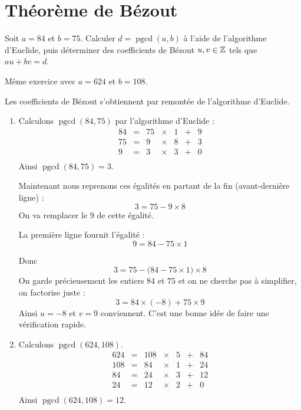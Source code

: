 \documentclass[11pt,class=report,crop=false]{standalone}
\newcommand{\pgcd}{\mathop{\mathrm{pgcd}}\nolimits}
\begin{document}
\section{Théorème de Bézout}


\exercice{}
\enonce
Soit $a=84$ et $b=75$. Calculer $d=\pgcd(a,b)$ à l'aide de l'algorithme d'Euclide, puis déterminer des coefficients de Bézout $u,v \in \mathbb{Z}$ tels que $au+bv=d$.

Même exercice avec $a=624$ et $b=108$.
\finenonce

\indication
Les coefficients de Bézout s'obtiennent par remontée de l'algorithme d'Euclide.
\finindication

\correction
\sauteligne

\begin{enumerate}
    \item   
    Calculons $\pgcd(84,75)$ par l'algorithme d'Euclide :
    $$
    \begin{array}{rclclcl}
    84 & = & 75 & \times & 1 & + & 9 \\
    75 & = & 9  & \times & 8 & + & \boxed{3} \\
    9  & = & 3  & \times & 3 & + & 0 \\
    \end{array}
    $$
    Ainsi $\pgcd(84,75) = 3$.
    
    Maintenant nous reprenons ces égalités en partant de la fin (avant-dernière ligne) :
    $$\boxed{3} = 75 - 9 \times 8$$
    On va remplacer le $9$ de cette égalité.
    
    La première ligne fournit l'égalité :
    $$9 = 84 -75 \times 1$$
    
    Donc 
    $$\boxed{3} = 75 - \big(84 -75 \times 1 \big) \times 8$$
    On garde précieusement les entiers $84$ et $75$ et on ne cherche pas à simplifier, on factorise juste :
    $$\boxed{3} = 84 \times (-8)  + 75 \times 9$$
    Ainsi $u=-8$ et $v=9$ conviennent. C'est une bonne idée de faire une vérification rapide.
    
    
    \item 
    Calculons $\pgcd(624,108)$.
    $$
    \begin{array}{rclclcl}
    624 & = & 108 & \times & 5 & + & 84 \\
    108 & = & 84  & \times & 1 & + & 24 \\
    84 & = & 24  & \times & 3 & + & \boxed{12} \\
    24 & = & 12  & \times & 2 & + & 0  \\
    \end{array}
    $$
    Ainsi $\pgcd(624,108) = 12$. 
    

\end{enumerate}
\end{document}

